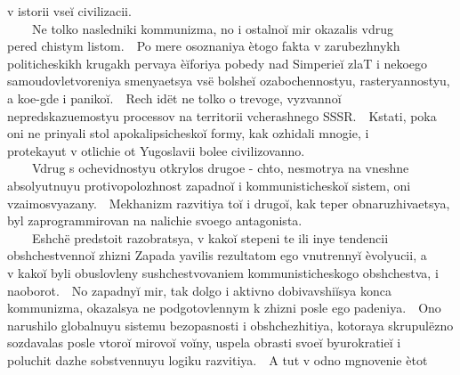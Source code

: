 {v istorii vse{\u i} civilizacii.\\
{\ \ }{\ \ }Ne tol{\cprime}ko nasledniki kommunizma, no i ostal{\cprime}no{\u i} mir okazalis{\cprime} vdrug\\
pered chistym listom.{\ \ }Po mere osoznaniya \`etogo fakta v zarubezhnykh\\
politicheskikh krugakh pervaya \`e{\u i}foriya pobedy nad Simperie{\u i} zlaT i nekoego\\
samoudovletvoreniya smenyaet{\cydot}sya vs\"e bol{\cprime}she{\u i} ozabochennost{\cprime}yu, rasteryannost{\cprime}yu,\\
a koe-gde i paniko{\u i}.{\ \ }Rech{\cprime} id\"et ne tol{\cprime}ko o trevoge, vyzvanno{\u i}\\
nepredskazuemost{\cprime}yu processov na territorii vcherashnego SSSR.{\ \ }Kstati, poka\\
oni ne prinyali stol{\cprime} apokalipsichesko{\u i} formy, kak ozhidali mnogie, i\\
protekayut v otlichie ot Yugoslavii bolee civilizovanno.\\
{\ \ }{\ \ }Vdrug s ochevidnost{\cprime}yu otkrylos{\cprime} drugoe - chto, nesmotrya na vneshne\\
absolyutnuyu protivopolozhnost{\cprime} zapadno{\u i} i kommunistichesko{\u i} sistem, oni\\
vzaimosvyazany.{\ \ }Mekhanizm razvitiya to{\u i} i drugo{\u i}, kak teper{\cprime} obnaruzhivaet{\cydot}sya,\\
byl zaprogrammirovan na nalichie svoego antagonista.\\
{\ \ }{\ \ }Eshch\"e predstoit razobrat{\cprime}sya, v kako{\u i} stepeni te ili inye tendencii\\
obshchestvenno{\u i} zhizni Zapada yavilis{\cprime} rezul{\cprime}tatom ego vnutrenny{\u i} \`evolyucii, a\\
v kako{\u i} byli obuslovleny sushchestvovaniem kommunisticheskogo obshchestva, i\\
naoborot.{\ \ }No zapadny{\u i} mir, tak dolgo i aktivno dobivavshi{\u i}sya konca\\
kommunizma, okazalsya ne podgotovlennym k zhizni posle ego padeniya.{\ \ }Ono\\
narushilo global{\cprime}nuyu sistemu bezopasnosti i obshchezhitiya, kotoraya skrupul\"ezno\\
sozdavalas{\cprime} posle vtoro{\u i} mirovo{\u i} vo{\u i}ny, uspela obrasti svoe{\u i} byurokratie{\u i} i\\
poluchit{\cprime} dazhe sobstvennuyu logiku razvitiya.{\ \ }A tut v odno mgnovenie \`etot\\
}
